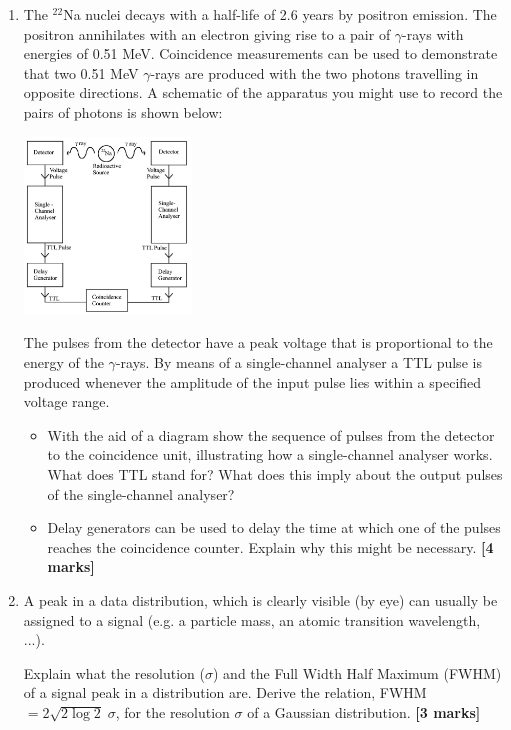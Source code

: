 \begin{enumerate}
\item The $^{22}$Na nuclei decays with a half-life of 2.6 years by positron emission. The positron annihilates with an electron giving rise to a pair of $\gamma$-rays with energies of 0.51 MeV. 
Coincidence measurements can be used to demonstrate that two 0.51 MeV $\gamma$-rays are produced  with the two photons travelling in opposite directions. A schematic  of the apparatus you might use to record the pairs of photons is shown below:
%
\begin{center}
 {\includegraphics[width=0.35\textwidth]{figs/positron-annihilation}}
 \end{center}
%
The pulses from the detector have a peak voltage that is proportional to the energy of the $\gamma$-rays. By means of  a  single-channel analyser  a TTL pulse is  produced whenever the amplitude of the input pulse lies within a specified voltage range.
\begin{itemize}
\item With the aid of a diagram show the sequence of pulses from the detector to the coincidence unit, illustrating how a single-channel analyser works.  What does TTL stand for?
What does this imply about the output pulses of the single-channel analyser?
\item Delay generators can be used to delay the time at which one of the pulses reaches the coincidence counter.
Explain why this might be necessary. %
%
\hfill {\bf [4 marks]}
%
\end{itemize}



\item A peak  in a data distribution, which is clearly visible (by eye) can usually be assigned to a signal (e.g. a particle mass, an atomic transition wavelength, ...). 

Explain what  the  resolution ($\sigma$) and the Full Width Half Maximum (FWHM)  of a signal peak in a distribution are. 
Derive the relation, FWHM$  = 2 \sqrt{2 \log 2}\; \sigma$, for the resolution $\sigma$ of a Gaussian distribution.  
\hfill {\bf [3 marks]}\\


\end{enumerate}
